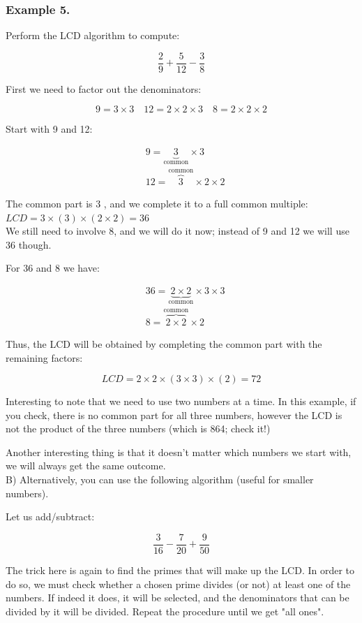 \documentclass{ximera}
\begin{document}
\subsubsection*{Example 5.}
Perform the LCD algorithm to compute:

$$\frac{2}{9}+\frac{5}{12}-\frac{3}{8}$$

First we need to factor out the denominators:

$$9=3 \times 3 \quad 12=2 \times 2 \times 3 \quad 8=2 \times 2 \times 2$$

Start with 9 and 12:

$$\begin{aligned}
& 9=\underbrace{3}_{\text{common}} \times 3 \\
& 12=\overbrace{3}^{\text{common}} \times 2 \times 2
\end{aligned}$$

The common part is 3 , and we complete it to a full common multiple:\\
$L C D=3 \times(3) \times(2 \times 2)=36$\\
We still need to involve 8, and we will do it now; instead of 9 and 12 we will use 36 though.

For 36 and 8 we have:

$$\begin{aligned}
& 36=\underbrace{2 \times 2}_{\text{common}} \times 3 \times 3 \\
& 8=\overbrace{2 \times 2}^{\text{common}} \times 2
\end{aligned}$$

Thus, the LCD will be obtained by completing the common part with the remaining factors:

$$L C D=2 \times 2 \times(3 \times 3) \times(2)=72$$

Interesting to note that we need to use two numbers at a time. In this example, if you check, there is no common part for all three numbers, however the LCD is not the product of the three numbers (which is 864; check it!)

Another interesting thing is that it doesn't matter which numbers we start with, we will always get the same outcome.\\
B) Alternatively, you can use the following algorithm (useful for smaller numbers).

Let us add/subtract:

$$\frac{3}{16}-\frac{7}{20}+\frac{9}{50}$$

The trick here is again to find the primes that will make up the LCD. In order to do so, we must check whether a chosen prime divides (or not) at least one of the numbers. If indeed it does, it will be selected, and the denominators that can be divided by it will be divided. Repeat the procedure until we get "all ones".
\end{document}
